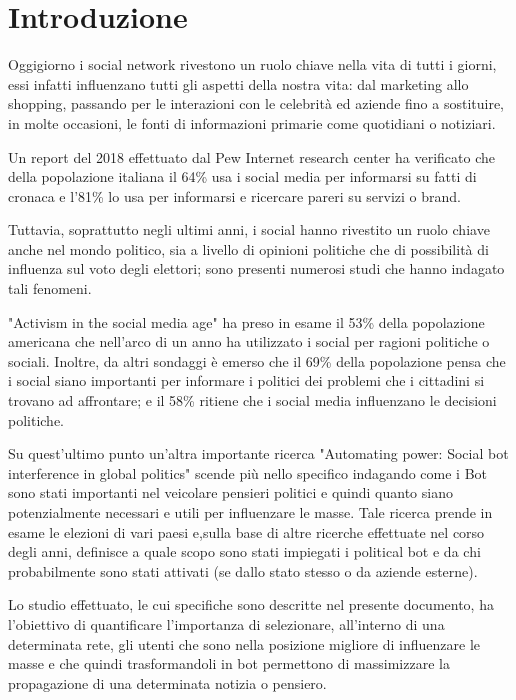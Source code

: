 \section*{Introduzione}

    Oggigiorno i social network rivestono un ruolo chiave nella vita di tutti i giorni, essi infatti influenzano tutti gli aspetti della nostra vita: dal marketing allo shopping, passando per le interazioni con le celebrità ed aziende fino a sostituire, in molte occasioni, le fonti di informazioni primarie come quotidiani o notiziari.
    
    Un report del 2018 effettuato dal Pew Internet research center \cite{ReportPewInternetResearch2018} ha verificato che della popolazione italiana il 64\% usa i social media per informarsi su fatti di cronaca e l’81\% lo usa per informarsi e ricercare pareri su servizi o brand.
    
    Tuttavia, soprattutto negli ultimi anni, i social hanno rivestito un ruolo chiave anche nel mondo politico, sia a livello di opinioni politiche che di possibilità di influenza sul voto degli elettori; sono presenti numerosi studi che hanno indagato tali fenomeni.
    
    "Activism in the social media age" \cite{ActivismSocialMedia} ha preso in esame il 53\% della popolazione americana che nell'arco di un anno ha utilizzato i social per ragioni politiche o sociali. Inoltre, da altri sondaggi è emerso che il 69\% della popolazione pensa che i social siano importanti per informare i politici dei problemi che i cittadini si trovano ad affrontare; e il 58\% ritiene che i social media influenzano le decisioni politiche.
    
    Su quest'ultimo punto un’altra importante ricerca "Automating power: Social bot interference in global politics" \cite{AutomaticPower} scende più nello specifico indagando come i Bot sono stati importanti nel veicolare pensieri politici e quindi quanto siano potenzialmente necessari e utili per influenzare le masse. Tale ricerca prende in esame le elezioni di vari paesi e,sulla base di altre ricerche effettuate nel corso degli anni, definisce a quale scopo sono stati impiegati i political bot e da chi probabilmente sono stati attivati (se dallo stato stesso o da aziende esterne).
    
    Lo studio effettuato, le cui specifiche sono descritte nel presente documento, ha l’obiettivo di quantificare l’importanza di selezionare, all’interno di una determinata rete, gli utenti che sono nella posizione migliore di influenzare le masse e che quindi trasformandoli in bot permettono di massimizzare la propagazione di una determinata notizia o pensiero.